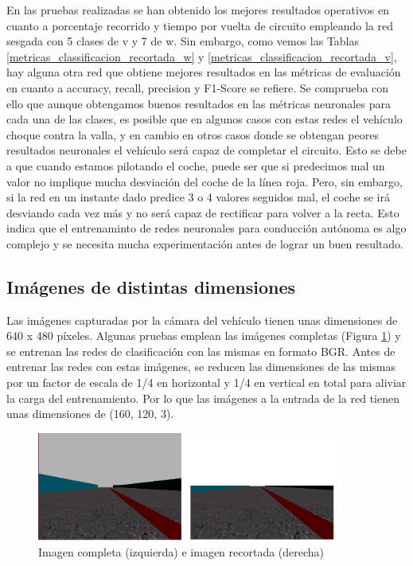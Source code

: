 En las pruebas realizadas se han obtenido los mejores resultados operativos en cuanto a porcentaje recorrido y tiempo por vuelta de circuito empleando la red sesgada con 5 clases de v y 7 de w. Sin embargo, como vemos las Tablas \ref{metricas_classificacion_recortada_w} y \ref{metricas_classificacion_recortada_v}, hay alguna otra red que obtiene mejores resultados en las métricas de evaluación en cuanto a accuracy, recall, precision y F1-Score se refiere. Se comprueba con ello que aunque obtengamos buenos resultados en las métricas neuronales para cada una de las clases, es posible que en algunos casos con estas redes el vehículo choque contra la valla, y en cambio en otros casos donde se obtengan peores resultados neuronales el vehículo será capaz de completar el circuito. Esto se debe a que cuando estamos pilotando el coche, puede ser que si predecimos mal un valor no implique mucha desviación del coche de la línea roja. Pero, sin embargo, si la red en un instante dado predice 3 o 4 valores seguidos mal, el coche se irá desviando cada vez más y no será capaz de rectificar para volver a la recta. Esto indica que el entrenaminto de redes neuronales para conducción autónoma es algo complejo y se necesita mucha experimentación antes de lograr un buen resultado.


\subsection{Imágenes de distintas dimensiones}\label{img_dimension}

Las imágenes capturadas por la cámara del vehículo tienen unas dimensiones de 640 x 480 píxeles. Algunas pruebas emplean las imágenes completas (Figura \ref{fig.imgs_class}) y se entrenan las redes de clasificación con las mismas en formato BGR. Antes de entrenar las redes con estas imágenes, se reducen las dimensiones de las mismas por un factor de escala de 1/4 en horizontal y 1/4 en vertical en total para aliviar la carga del entrenamiento. Por lo que las imágenes a la entrada de la red tienen unas dimensiones de (160, 120, 3).\\

\begin{figure}
\begin{center}
	\includegraphics[width=0.9\textwidth]{figures/Clasificacion/imgs.png}
   \caption{Imagen completa (izquierda) e imagen recortada (derecha)}
	\label{fig.imgs_class}
\end{center}
\end{figure}

